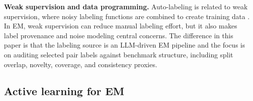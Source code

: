 \textbf{Weak supervision and data programming.} Auto-labeling is related to weak supervision, where noisy labeling functions are combined to create training data \cite{ratner2017snorkel}. In EM, weak supervision can reduce manual labeling effort, but it also makes label provenance and noise modeling central concerns. The difference in this paper is that the labeling source is an LLM-driven EM pipeline and the focus is on auditing selected pair labels against benchmark structure, including split overlap, novelty, coverage, and consistency proxies.

\subsection{Active learning for EM}
